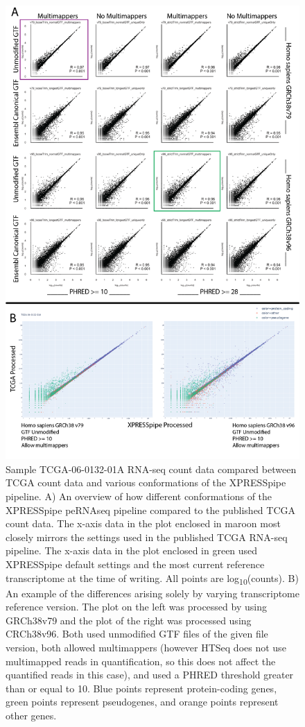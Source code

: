 \documentclass[11pt, a4paper, oneside]{article}
\begin{document}
\begin{figure}
\centering
  \includegraphics[width=180mm]{figures/xpresspipe_supplement4.png}
  \caption{Sample TCGA-06-0132-01A RNA-seq count data compared between TCGA count data and various conformations of the XPRESSpipe pipeline. A) An overview of how different conformations of the XPRESSpipe peRNAseq pipeline compared to the published TCGA count data. The x-axis data in the plot enclosed in maroon most closely mirrors the settings used in the published TCGA RNA-seq pipeline. The x-axis data in the plot enclosed in green used XPRESSpipe default settings and the most current reference transcriptome at the time of writing. All points are log\textsubscript{10}(counts). B) An example of the differences arising solely by varying transcriptome reference version. The plot on the left was processed by using GRCh38v79 and the plot of the right was processed using CRCh38v96. Both used unmodified GTF files of the given file version, both allowed multimappers (however HTSeq does not use multimapped reads in quantification, so this does not affect the quantified reads in this case), and used a PHRED threshold greater than or equal to 10. Blue points represent protein-coding genes, green points represent pseudogenes, and orange points represent other genes.}
  \label{fig:supplement4}
\end{figure}
\end{document}
